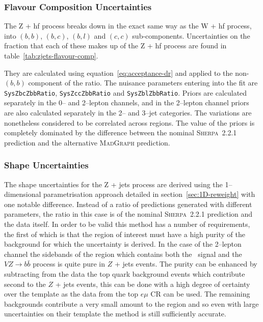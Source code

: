 \subsubsection{Flavour Composition Uncertainties}

The Z + hf process breaks down in the exact same way as the W + hf process, into
$(b,b)$, $(b, c)$, $(b, l)$ and $(c, c)$ sub-components. Uncertainties on the
fraction that each of these makes up of the Z + hf process are found in
table~\ref{tab:zjets-flavour-comp}.

They are calculated using equation~\ref{eq:acceptance-dr} and applied to the
non-$(b, b)$ component of the ratio. The nuisance parameters entering into the
fit are \texttt{SysZbcZbbRatio}, \texttt{SysZccZbbRatio} and
\texttt{SysZblZbbRatio}. Priors are calculated separately in the 0-- and
2--lepton channels, and in the 2--lepton channel priors are also calculated
separately in the 2-- and 3--jet categories. The variations are nonetheless
considered to be correlated across regions. The value of the priors is
completely dominated by the difference between the nominal \textsc{Sherpa}~2.2.1
prediction and the alternative \textsc{MadGraph} prediction.

\subsubsection{Shape Uncertainties}
\label{sec:zjets-shapes}

The shape uncertainties for the Z + jets process are derived using the
1--dimensional parametrisation approach detailed in
section~\ref{sec:1D-reweight} with one notable difference. Instead of a ratio of
predictions generated with different parameters, the ratio in this case is of
the nominal \textsc{Sherpa}~2.2.1 prediction and the data itself. In order to be
valid this method has a number of requirements, the first of which is that the
region of interest must have a high purity of the background for which the
uncertainty is derived. In the case of the 2--lepton channel the sidebands of
the region which contains both the \VHbb\ signal and the $V\!Z\! \to\! b\bar{b}$
process is quite pure in $Z$ + jets events. The purity can be enhanced by
subtracting from the data the top quark background events which contribute
second to the $Z$ + jets events, this can be done with a high degree of
certainty over the template as the data from the top $e\mu$ CR can be used. The
remaining backgrounds contribute a very small amount to the region and so even
with large uncertainties on their template the method is still sufficiently
accurate.

